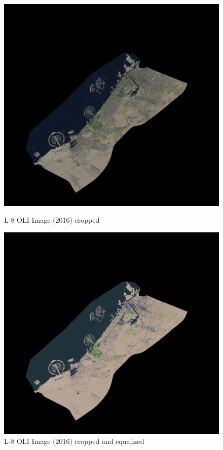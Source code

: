 \begin{figure}[h!]
\centering
\begin{minipage}{.5\textwidth}
	\centering
	\includegraphics[width=\textwidth-3em]{code/imagedata/alldata/2016cropped}
	\caption{L-8 OLI Image (2016) cropped}
	\label{fig:L8OLI_16_cropped}
\end{minipage}%
\begin{minipage}{.5\textwidth}
	\centering
	\includegraphics[width=\textwidth-3em]{code/imagedata/alldata/2016cropped_refd}
	\caption{L-8 OLI Image (2016) cropped and equalized}
	\label{fig:L8_OLI_16_equalised}
\end{minipage}
\end{figure}


